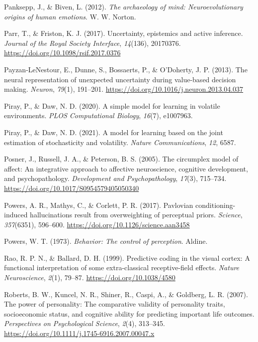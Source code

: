 \documentclass[
  jou,
  floatsintext,
  longtable,
  nolmodern,
  notxfonts,
  notimes,
  12pt,
  colorlinks=true,linkcolor=blue,citecolor=blue,urlcolor=blue]{apa7}
\newlength{\cslhangindent}
\newenvironment{CSLReferences}[2] %
 {\begin{list}{}{%
  \setlength{\itemindent}{0pt}
  \setlength{\leftmargin}{0pt}
  \setlength{\parsep}{0pt}
  \ifodd #1
   \setlength{\leftmargin}{\cslhangindent}
   \setlength{\itemindent}{-1\cslhangindent}
  \fi
  \setlength{\itemsep}{#2\baselineskip}}}
 {\end{list}}
\begin{document}
\begin{CSLReferences}{1}{0}
Panksepp, J., \& Biven, L. (2012). \emph{The archaeology of mind:
Neuroevolutionary origins of human emotions}. W. W. Norton.

Parr, T., \& Friston, K. J. (2017). Uncertainty, epistemics and active
inference. \emph{Journal of the Royal Society Interface},
\emph{14}(136), 20170376. \url{https://doi.org/10.1098/rsif.2017.0376}

Payzan-LeNestour, E., Dunne, S., Bossaerts, P., \& O'Doherty, J. P.
(2013). The neural representation of unexpected uncertainty during
value-based decision making. \emph{Neuron}, \emph{79}(1), 191--201.
\url{https://doi.org/10.1016/j.neuron.2013.04.037}

Piray, P., \& Daw, N. D. (2020). A simple model for learning in volatile
environments. \emph{PLOS Computational Biology}, \emph{16}(7), e1007963.

Piray, P., \& Daw, N. D. (2021). A model for learning based on the joint
estimation of stochasticity and volatility. \emph{Nature
Communications}, \emph{12}, 6587.

Posner, J., Russell, J. A., \& Peterson, B. S. (2005). The circumplex
model of affect: An integrative approach to affective neuroscience,
cognitive development, and psychopathology. \emph{Development and
Psychopathology}, \emph{17}(3), 715--734.
\url{https://doi.org/10.1017/S0954579405050340}

Powers, A. R., Mathys, C., \& Corlett, P. R. (2017). Pavlovian
conditioning-induced hallucinations result from overweighting of
perceptual priors. \emph{Science}, \emph{357}(6351), 596--600.
\url{https://doi.org/10.1126/science.aan3458}

Powers, W. T. (1973). \emph{Behavior: The control of perception}.
Aldine.

Rao, R. P. N., \& Ballard, D. H. (1999). Predictive coding in the visual
cortex: A functional interpretation of some extra-classical
receptive-field effects. \emph{Nature Neuroscience}, \emph{2}(1),
79--87. \url{https://doi.org/10.1038/4580}

Roberts, B. W., Kuncel, N. R., Shiner, R., Caspi, A., \& Goldberg, L. R.
(2007). The power of personality: The comparative validity of
personality traits, socioeconomic status, and cognitive ability for
predicting important life outcomes. \emph{Perspectives on Psychological
Science}, \emph{2}(4), 313--345.
\url{https://doi.org/10.1111/j.1745-6916.2007.00047.x}


\end{CSLReferences}
\end{document}
